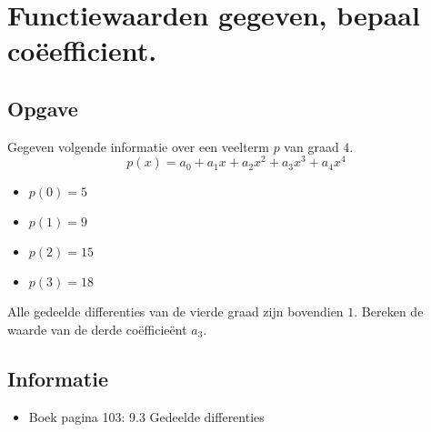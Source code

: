 \documentclass[examenvragen.tex]{subfiles}
\begin{document}
\section{Functiewaarden gegeven, bepaal co\"eefficient.}
\subsection{Opgave}
Gegeven volgende informatie over een veelterm $p$ van graad $4$.
\[
p(x) = a_{0} + a_1x + a_2x^{2} +a_{3}x^{3}+a_{4}x^{4}
\]
\begin{multicols}{4}
\begin{itemize}
\item $p(0)=5$
\item $p(1)=9$
\item $p(2)=15$
\item $p(3)=18$
\end{itemize}
\end{multicols}
Alle gedeelde differenties van de vierde graad zijn bovendien $1$.
Bereken de waarde van de derde co\"efficie\"ent $a_3$.
\subsection{Informatie}
\begin{itemize}
\item Boek pagina 103: 9.3 Gedeelde differenties
\end{itemize}
\end{document}
